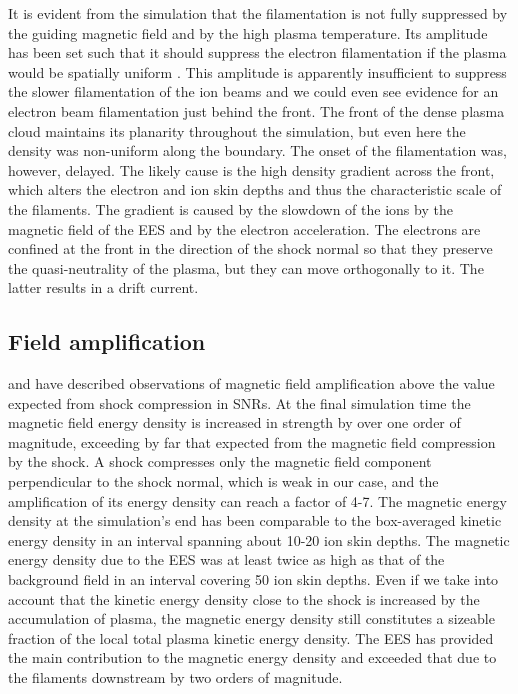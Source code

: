 \documentclass[structabstract]{aa}
\begin{document}
It is evident from the simulation that the filamentation is not fully 
suppressed by the guiding magnetic field and by the high plasma temperature. 
Its amplitude has been set such that it should suppress the electron 
filamentation if the plasma would be spatially uniform \citep{Mag}. This 
amplitude is apparently insufficient to suppress the slower filamentation 
of the ion beams and we could even see evidence for an electron beam 
filamentation just behind the front. The front of the dense plasma cloud 
maintains its planarity throughout the simulation, but even here the density 
was non-uniform along the boundary. The onset of the filamentation was, 
however, delayed. The likely cause is the high density gradient across the 
front, which alters the electron and ion skin depths and thus the 
characteristic scale of the filaments. The gradient is caused by the slowdown 
of the ions by the magnetic field of the EES and by the electron acceleration. 
The electrons are confined at the front in the direction of the shock normal
so that they preserve the quasi-neutrality of the plasma, but they can move
orthogonally to it. The latter results in a drift current. 

\subsection{Field amplification}

\citet{MagAmp2} and \citet{MagAmp1} have described observations of magnetic 
field amplification above the value expected from shock compression in 
SNRs. At the final simulation time the magnetic field energy 
density is increased in strength by over one order of magnitude, exceeding
by far that expected from the magnetic field compression by the shock. A 
shock compresses only the magnetic field component perpendicular to the 
shock normal, which is weak in our case, and the amplification of its energy
density can reach a factor of 4-7. The magnetic energy density at the 
simulation's end has been comparable to the box-averaged kinetic energy 
density in an interval spanning about 10-20 ion skin depths. The magnetic 
energy density due to the EES was at least twice as high as that of the 
background field in an interval covering 50 ion skin depths. Even if we take 
into account that the kinetic energy density close to the shock is increased 
by the accumulation of plasma, the magnetic energy density still constitutes 
a sizeable fraction of the local total plasma kinetic energy density. The EES 
has provided the main contribution to the magnetic energy density and exceeded 
that due to the filaments downstream by two orders of magnitude. 
\end{document}
